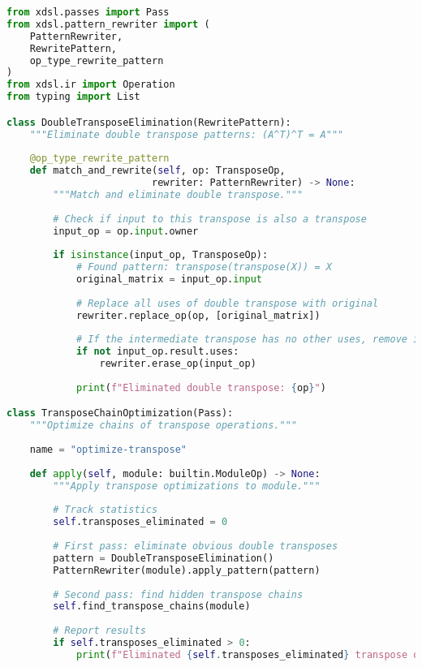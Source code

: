 \documentclass[11pt,a4paper]{article}
\begin{document}
\begin{lstlisting}[language=Python, caption=src/middle-end.py - Double Transpose Elimination]
from xdsl.passes import Pass
from xdsl.pattern_rewriter import (
    PatternRewriter,
    RewritePattern,
    op_type_rewrite_pattern
)
from xdsl.ir import Operation
from typing import List

class DoubleTransposeElimination(RewritePattern):
    """Eliminate double transpose patterns: (A^T)^T = A"""
    
    @op_type_rewrite_pattern
    def match_and_rewrite(self, op: TransposeOp, 
                         rewriter: PatternRewriter) -> None:
        """Match and eliminate double transpose."""
        
        # Check if input to this transpose is also a transpose
        input_op = op.input.owner
        
        if isinstance(input_op, TransposeOp):
            # Found pattern: transpose(transpose(X)) = X
            original_matrix = input_op.input
            
            # Replace all uses of double transpose with original
            rewriter.replace_op(op, [original_matrix])
            
            # If the intermediate transpose has no other uses, remove it
            if not input_op.result.uses:
                rewriter.erase_op(input_op)
            
            print(f"Eliminated double transpose: {op}")

class TransposeChainOptimization(Pass):
    """Optimize chains of transpose operations."""
    
    name = "optimize-transpose"
    
    def apply(self, module: builtin.ModuleOp) -> None:
        """Apply transpose optimizations to module."""
        
        # Track statistics
        self.transposes_eliminated = 0
        
        # First pass: eliminate obvious double transposes
        pattern = DoubleTransposeElimination()
        PatternRewriter(module).apply_pattern(pattern)
        
        # Second pass: find hidden transpose chains
        self.find_transpose_chains(module)
        
        # Report results
        if self.transposes_eliminated > 0:
            print(f"Eliminated {self.transposes_eliminated} transpose operations")
    

\end{lstlisting}
\end{document}
